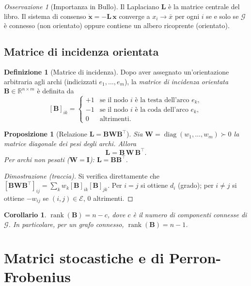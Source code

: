 \documentclass[a4paper,11pt]{article}
\theoremstyle{definition}
\newtheorem{defn}{Definizione}[section]
\theoremstyle{plain}
\newtheorem{prop}{Proposizione}[section]
\newtheorem{cor}{Corollario}[section]
\theoremstyle{remark}
\newtheorem{oss}{Osservazione}[section]
\newcommand{\R}{\mathbb{R}}
\newcommand{\mat}[1]{\mathbf{#1}}
\newcommand{\vect}[1]{\bm{#1}}
\DeclareMathOperator{\diag}{diag}
\DeclareMathOperator{\rank}{rank}
\begin{document}
\begin{oss}[Importanza in Bullo]
Il Laplaciano $\mat{L}$ è la matrice centrale del libro. Il sistema di consenso
$\dot{\vect{x}} = -\mat{L}\,\vect{x}$ converge a $x_i \to \bar{x}$ per ogni $i$
se e solo se $\mathcal{G}$ è connesso (non orientato) oppure contiene un albero
ricoprente (orientato).
\end{oss}

\subsection{Matrice di incidenza orientata}

\begin{defn}[Matrice di incidenza]
Dopo aver assegnato un'orientazione arbitraria agli archi (indicizzati
$e_1, \ldots, e_m$), la \emph{matrice di incidenza orientata}
$\mat{B} \in \R^{n \times m}$ è definita da
\[
  [\mat{B}]_{ik} =
  \begin{cases}
    +1  & \text{se il nodo } i \text{ è la testa dell'arco } e_k,\\
    -1  & \text{se il nodo } i \text{ è la coda dell'arco } e_k,\\
    0   & \text{altrimenti.}
  \end{cases}
\]
\end{defn}

\begin{prop}[Relazione $\mat{L} = \mat{B}\mat{W}\mat{B}^\top$]
Sia $\mat{W} = \diag(w_1, \ldots, w_m) \succ 0$ la matrice diagonale dei pesi
degli archi. Allora
\[
  \mat{L} = \mat{B}\,\mat{W}\,\mat{B}^\top.
\]
Per archi non pesati ($\mat{W}=\mat{I}$): $\mat{L} = \mat{B}\mat{B}^\top$.
\end{prop}

\begin{proof}[Dimostrazione (traccia)]
Si verifica direttamente che
$[\mat{B}\mat{W}\mat{B}^\top]_{ij} = \sum_k w_k [\mat{B}]_{ik}[\mat{B}]_{jk}$.
Per $i=j$ si ottiene $d_i$ (grado); per $i\neq j$ si ottiene $-w_{ij}$
se $(i,j)\in\mathcal{E}$, $0$ altrimenti.
\end{proof}

\begin{cor}
$\rank(\mat{B}) = n - c$, dove $c$ è il numero di componenti connesse di $\mathcal{G}$.
In particolare, per un grafo connesso, $\rank(\mat{B}) = n-1$.
\end{cor}

\section{Matrici stocastiche e di Perron-Frobenius}
\end{document}

